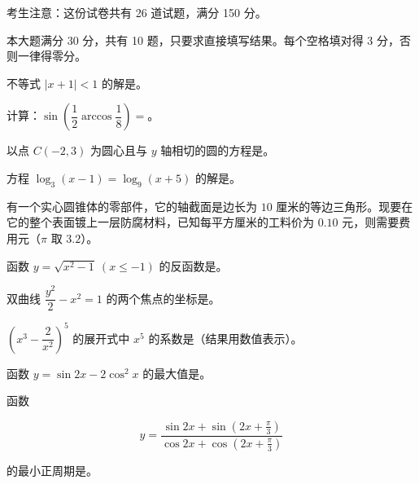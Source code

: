 

考生注意：这份试卷共有 26 道试题，满分 150 分。


本大题满分 30 分，共有 10 题，只要求直接填写结果。每个空格填对得 3 分，否则一律得零分。

\begin{question}
不等式 $|x+1|<1$ 的解是\gkblank{}。

\end{question}
\begin{question}
计算：$\sin\left(\dfrac12\arccos\dfrac18\right)=$\gkblank{}。

\end{question}
\begin{question}
以点 $C(-2,3)$ 为圆心且与 $y$ 轴相切的圆的方程是\gkblank{}。

\end{question}
\begin{question}
方程 $\log_3(x-1)=\log_9(x+5)$ 的解是\gkblank{}。

\end{question}
\begin{question}
有一个实心圆锥体的零部件，它的轴截面是边长为 $10$ 厘米的等边三角形。现要在它的整个表面镀上一层防腐材料，已知每平方厘米的工料价为 $0.10$ 元，则需要费用\gkblank{}元（$\pi$ 取 $3.2$）。

\end{question}
\begin{question}
函数 $y=\sqrt{x^2-1}\ (x\le -1)$ 的反函数是\gkblank{}。

\end{question}
\begin{question}
双曲线 $\dfrac{y^2}{2}-x^2=1$ 的两个焦点的坐标是\gkblank{}。

\end{question}
\begin{question}
$\left(x^3-\dfrac2{x^2}\right)^5$ 的展开式中 $x^5$ 的系数是\gkblank{}（结果用数值表示）。

\end{question}
\begin{question}
函数 $y=\sin 2x-2\cos^2x$ 的最大值是\gkblank{}。

\end{question}
\begin{question}
函数

\nopagebreak[4]
\[
y=\frac{\sin 2x+\sin\left(2x+\frac\pi3\right)}{\cos 2x+\cos\left(2x+\frac\pi3\right)}
\]

的最小正周期是\gkblank{}。

\end{question}


